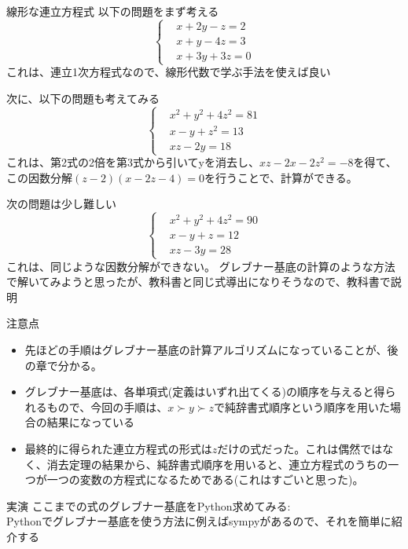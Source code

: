 
\begin{frame}{線形な連立方程式}
以下の問題をまず考える
\begin{equation}
\left\{
   \begin{aligned}
   & x+2y-z=2 \\
   & x+y-4z=3 \\
   & x+3y+3z=0
   \end{aligned}
\right.
\end{equation}
これは、連立1次方程式なので、線形代数で学ぶ手法を使えば良い
\end{frame}

\begin{frame}
次に、以下の問題も考えてみる
\begin{equation}
\left\{
   \begin{aligned}
   & x^2+y^2+4z^2=81 \\
   & x-y+z^2=13 \\
   & xz-2y=18
   \end{aligned}
\right.
\end{equation}
これは、第2式の2倍を第3式から引いてyを消去し、$xz-2x-2z^2=-8$を得て、この因数分解$(z-2)(x-2z-4)=0$を行うことで、計算ができる。
\end{frame}

\begin{frame}
次の問題は少し難しい
\begin{equation}
\left\{
   \begin{aligned}
   & x^2+y^2+4z^2=90 \\
   & x-y+z=12 \\
   & xz-3y=28
   \end{aligned}
\right.
\end{equation}
これは、同じような因数分解ができない。
グレブナー基底の計算のような方法で解いてみようと思ったが、教科書と同じ式導出になりそうなので、教科書で説明
\end{frame}

\begin{frame} {注意点}

\begin{itemize}
\item 先ほどの手順はグレブナー基底の計算アルゴリズムになっていることが、後の章で分かる。
\item グレブナー基底は、各単項式(定義はいずれ出てくる)の順序を与えると得られるもので、今回の手順は、$x \succ y \succ z$で純辞書式順序という順序を用いた場合の結果になっている
\item 最終的に得られた連立方程式の形式は$z$だけの式だった。これは偶然ではなく、消去定理の結果から、純辞書式順序を用いると、連立方程式のうちの一つが一つの変数の方程式になるためである(これはすごいと思った)。
\end{itemize}
\end{frame}

\begin{frame} {実演}
ここまでの式のグレブナー基底をPython求めてみる: \\
Pythonでグレブナー基底を使う方法に例えばsympyがあるので、それを簡単に紹介する
\end{frame}
